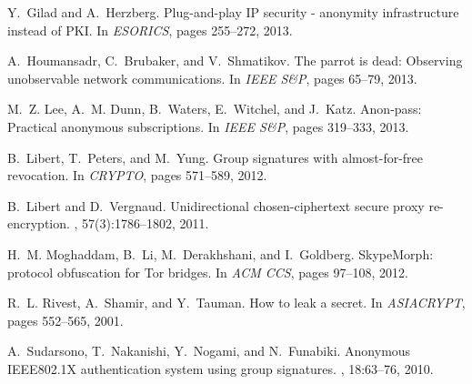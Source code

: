 \documentclass[preprint]{sig-alternate}
\begin{document}
\begin{thebibliography}{10}
\bibitem{[GiladH13]}
Y.~Gilad and A.~Herzberg.
\newblock Plug-and-play {IP} security - anonymity infrastructure instead of
  {PKI}.
\newblock In {\em ESORICS}, pages 255--272, 2013.

A.~Houmansadr, C.~Brubaker, and V.~Shmatikov.
\newblock The parrot is dead: Observing unobservable network communications.
\newblock In {\em IEEE S\&P}, pages 65--79, 2013.

M.~Z. Lee, A.~M. Dunn, B.~Waters, E.~Witchel, and J.~Katz.
\newblock Anon-pass: Practical anonymous subscriptions.
\newblock In {\em IEEE S\&P}, pages 319--333, 2013.

\bibitem{[LibertPY12]}
B.~Libert, T.~Peters, and M.~Yung.
\newblock Group signatures with almost-for-free revocation.
\newblock In {\em CRYPTO}, pages 571--589, 2012.

\bibitem{[LibertV11]}
B.~Libert and D.~Vergnaud.
\newblock Unidirectional chosen-ciphertext secure proxy re-encryption.
, 57(3):1786--1802, 2011.

\bibitem{[MoghaddamLDG12]}
H.~M. Moghaddam, B.~Li, M.~Derakhshani, and I.~Goldberg.
\newblock Skype{M}orph: protocol obfuscation for {T}or bridges.
\newblock In {\em ACM CCS}, pages 97--108, 2012.

\bibitem{[RivestST01]}
R.~L. Rivest, A.~Shamir, and Y.~Tauman.
\newblock How to leak a secret.
\newblock In {\em ASIACRYPT}, pages 552--565, 2001.

\bibitem{[SudarsonoNNF10]}
A.~Sudarsono, T.~Nakanishi, Y.~Nogami, and N.~Funabiki.
\newblock Anonymous {IEEE}802.1{X} authentication system using group
  signatures.
, 18:63--76, 2010.

\end{thebibliography}
\end{document}
